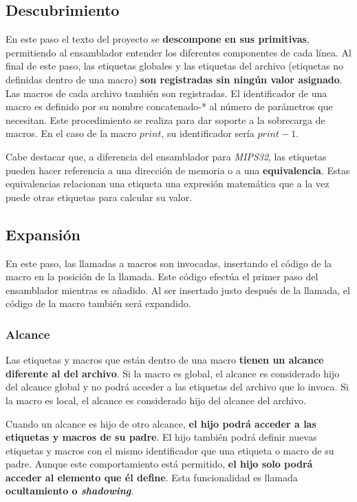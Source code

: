 \subsection{Descubrimiento}\label{subsec:descubrimiento}

En este paso el texto del proyecto se \textbf{descompone en sus primitivas},
permitiendo al ensamblador entender los diferentes componentes de cada línea.
Al final de este paso, las etiquetas globales y las etiquetas del archivo
(etiquetas no definidas dentro de una macro) \textbf{son registradas sin
ningún valor asignado}.
Las macros de cada archivo también son registradas.
El identificador de una macro es definido por su nombre concatenado-*
al número de parámetros que necesitan.
Este procedimiento se realiza para dar soporte a la sobrecarga de macros.
En el caso de la macro $print$, su identificador sería
$print-1$.

Cabe destacar que, a diferencia del ensamblador para \textit{MIPS32},
las etiquetas pueden hacer referencia a una dirección de memoria
o a una \textbf{equivalencia}.
Estas equivalencias relacionan una etiqueta  una expresión matemática
que a la vez puede  otras etiquetas para calcular su valor.

\subsection{Expansión}\label{subsec:expansion}

En este paso, las llamadas a macros son invocadas,
insertando el código de la macro en la posición de la llamada.
Este código efectúa el primer paso del ensamblador mientras es añadido.
Al ser insertado justo después de la llamada, el código de la macro
también será expandido.

\subsubsection{Alcance}\label{subsubsec:alcance}

Las etiquetas y macros que están dentro de una macro
\textbf{tienen un alcance diferente al del archivo}.
Si la macro es global, el alcance es considerado hijo del alcance global
y no podrá acceder a las etiquetas del archivo que lo invoca.
Si la macro es local, el alcance es considerado hijo del alcance del archivo.

Cuando un alcance es hijo de otro alcance,
\textbf{el hijo podrá acceder a las etiquetas y macros de su padre}.
El hijo también podrá definir nuevas etiquetas y macros con el mismo
identificador que una etiqueta o macro de su padre.
Aunque este comportamiento está permitido, \textbf{el hijo solo podrá acceder
al elemento que él define}.
Esta funcionalidad es llamada \textbf{ocultamiento o \textit{shadowing}}.

